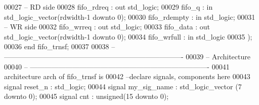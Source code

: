 \begin{DoxyCode}
00027 \textcolor{keyword}{      -- RD side  }
00028       \textcolor{vhdlchar}{fifo_rdreq}     \textcolor{vhdlchar}{:} \textcolor{keywordflow}{out} \textcolor{comment}{std\_logic};
00029       \textcolor{vhdlchar}{fifo_q}         \textcolor{vhdlchar}{:} \textcolor{keywordflow}{in}  \textcolor{comment}{std\_logic\_vector}\textcolor{vhdlchar}{(}\textcolor{vhdlchar}{rdwidth}\textcolor{vhdlchar}{-}\textcolor{vhdllogic}{}\textcolor{vhdllogic}{1} \textcolor{keywordflow}{downto} \textcolor{vhdllogic}{}\textcolor{vhdllogic}{0}\textcolor{vhdlchar}{)};
00030       \textcolor{vhdlchar}{fifo_rdempty}   \textcolor{vhdlchar}{:} \textcolor{keywordflow}{in}  \textcolor{comment}{std\_logic};
00031 \textcolor{keyword}{      -- WR side  }
00032       \textcolor{vhdlchar}{fifo_wrreq}     \textcolor{vhdlchar}{:} \textcolor{keywordflow}{out} \textcolor{comment}{std\_logic};
00033       \textcolor{vhdlchar}{fifo_data}      \textcolor{vhdlchar}{:} \textcolor{keywordflow}{out} \textcolor{comment}{std\_logic\_vector}\textcolor{vhdlchar}{(}\textcolor{vhdlchar}{rdwidth}\textcolor{vhdlchar}{-}\textcolor{vhdllogic}{}\textcolor{vhdllogic}{1} \textcolor{keywordflow}{downto} \textcolor{vhdllogic}{}\textcolor{vhdllogic}{0}\textcolor{vhdlchar}{)};
00034       \textcolor{vhdlchar}{fifo_wrfull}    \textcolor{vhdlchar}{:} \textcolor{keywordflow}{in}  \textcolor{comment}{std\_logic}
00035    \textcolor{vhdlchar}{)};
00036 \textcolor{keywordflow}{end} \textcolor{vhdlchar}{fifo\_trnsf};
00037 
00038 \textcolor{keyword}{-- ----------------------------------------------------------------------------}
00039 \textcolor{keyword}{-- Architecture}
00040 \textcolor{keyword}{-- ----------------------------------------------------------------------------}
00041 \textcolor{keywordflow}{architecture} arch \textcolor{keywordflow}{of} fifo_trnsf is
00042 \textcolor{keyword}{--declare signals,  components here}
00043 \textcolor{keywordflow}{signal} \textcolor{vhdlchar}{reset_n}          \textcolor{vhdlchar}{:} \textcolor{comment}{std\_logic};
00044 \textcolor{keywordflow}{signal} \textcolor{vhdlchar}{my_sig_name}      \textcolor{vhdlchar}{:} \textcolor{comment}{std\_logic\_vector} \textcolor{vhdlchar}{(}\textcolor{vhdllogic}{}\textcolor{vhdllogic}{7} \textcolor{keywordflow}{downto} \textcolor{vhdllogic}{}\textcolor{vhdllogic}{0}\textcolor{vhdlchar}{)}; 
00045 \textcolor{keywordflow}{signal} \textcolor{vhdlchar}{cnt}              \textcolor{vhdlchar}{:} \textcolor{comment}{unsigned}\textcolor{vhdlchar}{(}\textcolor{vhdllogic}{}\textcolor{vhdllogic}{15} \textcolor{keywordflow}{downto} \textcolor{vhdllogic}{}\textcolor{vhdllogic}{0}\textcolor{vhdlchar}{)};

\end{DoxyCode}
